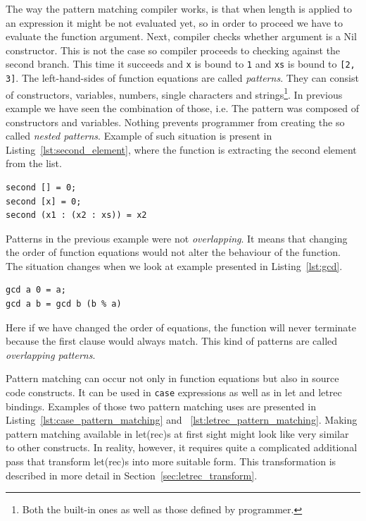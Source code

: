 \documentclass[12pt,a4paper]{report}
\begin{document}
The way the pattern matching compiler works, is that when length is applied to
an expression it might be not evaluated yet, so in order to proceed we have to
evaluate the function argument. Next, compiler checks whether argument is a Nil
constructor. This is not the case so compiler proceeds to checking against the
second branch. This time it succeeds and \texttt{x} is bound to \texttt{1} and
\texttt{xs} is bound to \texttt{[2, 3]}. The left-hand-sides of function
equations are called \textit{patterns}. They can consist of constructors,
variables, numbers, single characters and strings\footnote{Both the built-in
ones as well as those defined by programmer.}. In previous example we have seen
the combination of those, i.e. The pattern was composed of constructors and
variables. Nothing prevents programmer from creating the so called
\textit{nested patterns}. Example of such situation is present in
Listing~\ref{lst:second_element}, where the function is extracting the second
element from the list.

\vspace*{0.2in}
\begin{lstlisting}[style=haskell,label=lst:second_element,caption={Greatest common divisor.}]
second [] = 0;
second [x] = 0;
second (x1 : (x2 : xs)) = x2
\end{lstlisting}

Patterns in the previous example were not \textit{overlapping}. It
means that changing the order of function equations would not alter the
behaviour of the function. The situation changes when we look at example
presented in Listing~\ref{lst:gcd}.

\vspace*{0.2in}
\begin{lstlisting}[style=haskell,label=lst:gcd,caption={Greatest common divisor.}]
gcd a 0 = a;
gcd a b = gcd b (b % a)
\end{lstlisting}

Here if we have changed the order of equations, the function will never terminate
because the first clause would always match. This kind of patterns are called
\textit{overlapping patterns}.

Pattern matching can occur not only in function equations but also in source
code constructs. It can be used in \texttt{case} expressions as well as in
let and letrec bindings. Examples of those two pattern
matching uses are presented in Listing~\ref{lst:case_pattern_matching} and
~\ref{lst:letrec_pattern_matching}.  Making pattern matching available in
let(rec)s at first sight might look like very similar to other constructs. In
reality, however, it requires quite a complicated additional pass that
transform let(rec)s into more suitable form.  This transformation is described
in more detail in Section~\ref{sec:letrec_transform}.
\end{document}
